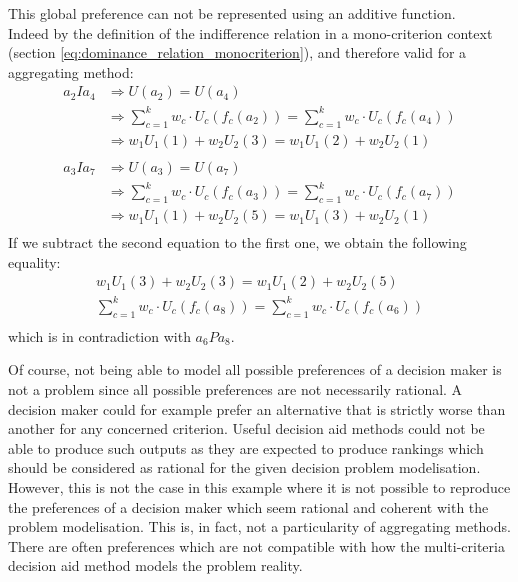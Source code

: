 This global preference can not be represented using an additive function. \\
Indeed by the definition of the indifference relation in a mono-criterion context (section \ref{eq:dominance_relation_monocriterion}), and therefore valid for a aggregating method:
\begin{equation}
    \begin{split}
        a_2Ia_4 & \Rightarrow U(a_2) = U(a_4) \\
        & \Rightarrow  \sum\limits^k_{c=1} w_c \cdot U_c(f_c(a_2)) = \sum\limits^k_{c=1} w_c \cdot U_c(f_c(a_4)) \\
        & \Rightarrow w_1 U_1(1) + w_2 U_2(3) = w_1 U_1(2) + w_2  U_2(1) \\
        & \\
        a_3Ia_7 & \Rightarrow U(a_3) = U(a_7) \\
        & \Rightarrow  \sum\limits^k_{c=1} w_c \cdot U_c(f_c(a_3)) = \sum\limits^k_{c=1} w_c \cdot U_c(f_c(a_7)) \\
        & \Rightarrow w_1 U_1(1) + w_2 U_2(5) = w_1 U_1(3) + w_2  U_2(1) \\
    \end{split}
\end{equation}
If we subtract the second equation to the first one, we obtain the following equality:
\begin{equation}
    \begin{split}
    w_1 U_1(3) + w_2 U_2(3) = w_1 U_1(2) + w_2 U_2(5) \\
    \sum\limits^k_{c=1} w_c \cdot U_c(f_c(a_8)) = \sum\limits^k_{c=1} w_c \cdot U_c(f_c(a_6)) \\
    \end{split}
    \label{eq:example_vincke_step2}
\end{equation}
which is in contradiction with $a_6Pa_8$.

Of course, not being able to model all possible preferences of a decision maker is not a problem since all possible preferences are not necessarily rational.
A decision maker could for example prefer an alternative that is strictly worse than another for any concerned criterion.
Useful decision aid methods could not be able to produce such outputs as they are expected to produce rankings which should be considered as rational for the given decision problem modelisation.\\
However, this is not the case in this example where it is not possible to reproduce the preferences of a decision maker which seem rational and coherent with the problem modelisation.
This is, in fact, not a particularity of aggregating methods. There are often preferences which are not compatible with how the multi-criteria decision aid method models the problem reality.

